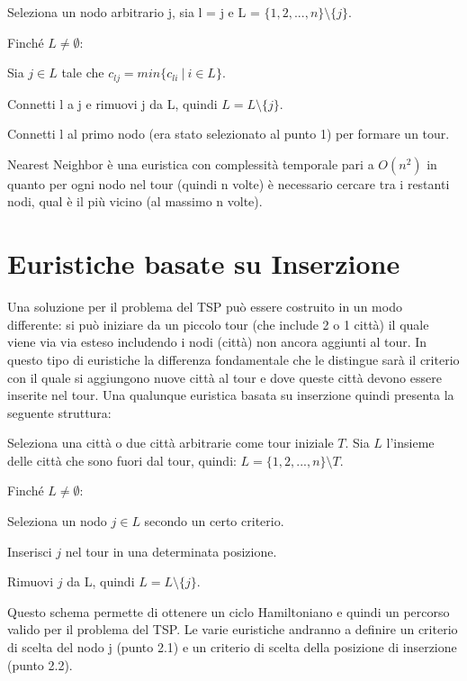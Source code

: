 \documentclass[a4paper,12pt]{report}
\begin{document}
\begin{tcolorbox}[colframe=black,colback=white,boxrule=0.5pt, sharp corners]
\begin{legal}
  \item Seleziona un nodo arbitrario j, sia l = j e L = $\{1, 2, ..., n\} \setminus \{j\}$.
  \item Finché $L \neq \emptyset$:
  \begin{legal}
    \item Sia $j \in L$ tale che $c_{lj} = min\{c_{li} \  | \  i \in L\}$.
    \item Connetti l a j e rimuovi j da L, quindi $ L = L \setminus \{j\} $.
  \end{legal}
  \item Connetti l al primo nodo (era stato selezionato al punto 1) per formare un tour.
\end{legal}
\end{tcolorbox}
\hfill \break
Nearest Neighbor è una euristica con complessità temporale pari a $O(n^2)$ in quanto per ogni nodo nel tour (quindi n volte) è necessario cercare tra i restanti nodi, qual è il più vicino (al massimo n volte).

\section{Euristiche basate su Inserzione}
Una soluzione per il problema del TSP può essere costruito in un modo differente: si può iniziare da un piccolo tour (che include 2 o 1 città) il quale viene via via esteso includendo i nodi (città) non ancora aggiunti al tour. In questo tipo di euristiche la differenza fondamentale che le distingue sarà il criterio con il quale si aggiungono nuove città al tour e dove queste città devono essere inserite nel tour. Una qualunque euristica basata su inserzione quindi presenta la seguente struttura:

\begin{tcolorbox}[colframe=black,colback=white,boxrule=0.5pt, sharp corners]
\begin{legal}
  \item Seleziona una città o due città arbitrarie come tour iniziale $T$. Sia $L$ l'insieme delle città che sono fuori dal tour, quindi: $L = \{1, 2, ..., n\} \setminus T$.
  \item Finché $L \neq \emptyset$:
  \begin{legal}
    \item Seleziona un nodo $j \in L$ secondo un certo criterio.
    \item Inserisci $j$ nel tour in una determinata posizione.
    \item Rimuovi $j$ da L, quindi $L = L \setminus \{j\}$.
  \end{legal}
\end{legal}
\end{tcolorbox}
\hfill \break
Questo schema permette di ottenere un ciclo Hamiltoniano e quindi un percorso valido per il problema del TSP. Le varie euristiche andranno a definire un criterio di scelta del nodo j (punto 2.1) e un criterio di scelta della posizione di inserzione (punto 2.2).
\end{document}
